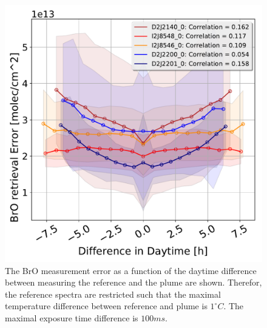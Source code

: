 \documentclass  [
  paper    = a4,
  BCOR     = 10mm,
  twoside,
  fontsize = 12pt,
  fleqn,
  toc      = bibnumbered,
  toc      = listofnumbered,
  numbers  = noendperiod,
  headings = normal,
  listof   = leveldown,
  version  = 3.03
]                                       {scrreprt}
\begin{document}
\begin{figure}[h]
	\centering
	\includegraphics[width=0.7\linewidth]{Bilder/BrOErr_OhnEVar/DiffDaytimewithoutOtherparamallInstruments}
	\caption{The BrO measurement error as a function of the daytime difference between measuring the reference and the plume are shown. Therefor, the reference spectra are restricted such that the maximal temperature difference between reference and plume is $1^\circ C$. The maximal exposure time difference is $100 ms$.
	}
	\label{fig:diffdaytimewithoutotherparamallinstruments}
\end{figure}
\end{document}
